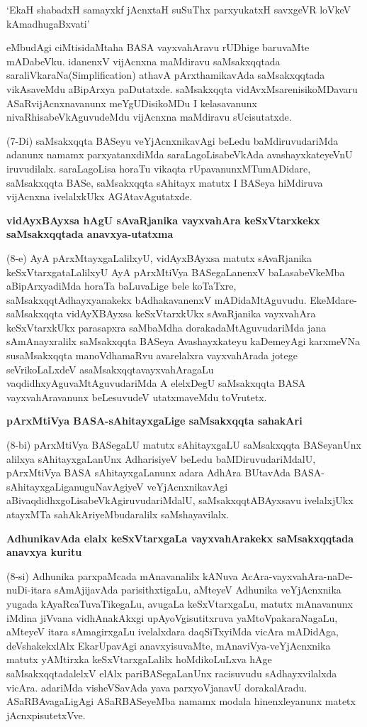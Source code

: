 \begin{shloka}
`EkaH shabadxH samayxkf jAcnxtaH suSuThx parxyukatxH savxgeVR loVkeV kAmadhugaBxvati'
\end{shloka}

eMbudAgi ciMtisidaMtaha BASA vayxvahAravu rUDhige baruvaMte mADabeVku. idanenxV vijAcnxna maMdiravu saMsakxqqtada saraliVkaraNa{(\rm Simplification)} athavA pArxthamikavAda saMsakxqqtada vikAsaveMdu aBipArxya paDutatxde. saMsakxqqta vidAvxMsarenisikoMDavaru ASaRvijAcnxnavanunx meYgUDisikoMDu I kelasavanunx nivaRhisabeVkAguvudeMdu vijAcnxna maMdiravu sUcisutatxde.

(7-Di) saMsakxqqta BASeyu veYjAcnxnikavAgi beLedu baMdiruvudariMda adanunx namamx parxyatanxdiMda saraLagoLisabeVkAda avashayxkateyeVnU  iruvudilalx. saraLagoLisa horaTu vikaqta rUpavanunxMTumADidare, saMsakxqqta BASe, saMsakxqqta sAhitayx matutx I BASeya hiMdiruva vijAcnxna ivelalxkUkx AGAtavAgutatxde.

\textbf{vidAyxBAyxsa hAgU sAvaRjanika vayxvahAra keSxVtarxkekx saMsakxqqtada anavxya-utatxma}

(8-e) AyA pArxMtayxgaLalilxyU, vidAyxBAyxsa matutx sAvaRjanika keSxVtarxgataLalilxyU AyA pArxMtiVya BASegaLanenxV baLasabeVkeMba aBipArxyadiMda horaTa baLuvaLige bele koTaTxre, saMsakxqqtAdhayxyanakekx bAdhakavanenxV mADidaMtAguvudu. EkeMdare-saMsakxqqta vidAyXBAyxsa keSxVtarxkUkx sAvaRjanika vayxvahAra keSxVtarxkUkx parasapxra saMbaMdha dorakadaMtAguvudariMda jana sAmAnayxralilx saMsakxqqta BASeya Avashayxkateyu kaDemeyAgi karxmeVNa susaMsakxqqta manoVdhamaRvu avarelalxra vayxvahArada jotege seVrikoLaLxdeV asaMsakxqqtavayxvahAragaLu vaqdidhxyAguvaMtAguvudariMda A elelxDegU saMsakxqqta BASA vayxvahAravanunx beLesuvudeV utatxmaveMdu toVrutetx.

\textbf{pArxMtiVya BASA-sAhitayxgaLige saMsakxqqta sahakAri}

(8-bi) pArxMtiVya BASegaLU matutx sAhitayxgaLU saMsakxqqta BASeyanUnx alilxya sAhitayxgaLanUnx AdharisiyeV beLedu baMDiruvudariMdalU, pArxMtiVya BASA sAhitayxgaLanunx adara AdhAra BUtavAda BASA-sAhitayxgaLiganuguNavAgiyeV veYjAcnxnikavAgi aBivaqdidhxgoLisabeVkAgiruvudariMdalU, saMsakxqqtABAyxsavu ivelalxjUkx atayxMTa sahAkAriyeMbudaralilx saMshayavilalx.

\textbf{AdhunikavAda elalx keSxVtarxgaLa vayxvahArakekx saMsakxqqtada anavxya kuritu}

(8-si) Adhunika parxpaMcada mAnavanalilx kANuva AcAra-vayxvahAra-naDe-nuDi-itara sAmAjijavAda parisithxtigaLu, aMteyeV Adhunika veYjAcnxnika yugada kAyaRcaTuvaTikegaLu, avugaLa keSxVtarxgaLu, matutx mAnavanunx iMdina jiVvana vidhAnakAkxgi upAyoVgisutitxruva yaMtoVpakaraNagaLu, aMteyeV itara sAmagirxgaLu ivelalxdara daqSiTxyiMda vicAra mADidAga, deVshakekxlAlx EkarUpavAgi anavxyisuvaMte, mAnaviVya-veYjAcnxnika matutx yAMtirxka keSxVtarxgaLalilx hoMdikoLuLxva hAge saMsakxqqtadalelxV elAlx pariBASegaLanUnx racisuvudu sAdhayxvilalxda vicAra. adariMda visheVSavAda yava parxyoVjanavU dorakalAradu. ASaRBAvagaLigAgi ASaRBASeyeMba namamx modala hinenxleyanunx matetx jAcnxpisutetxVve.

